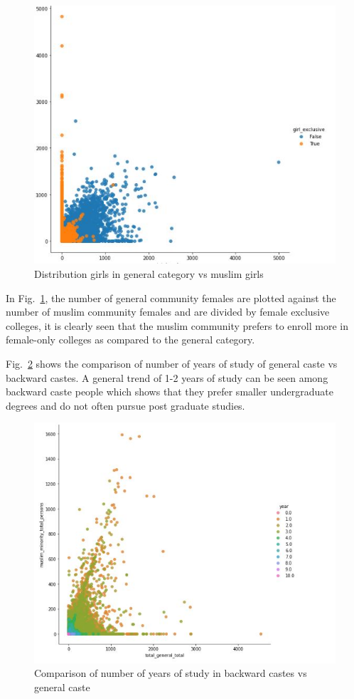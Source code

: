 \begin{figure}[h]
\centerline{\includegraphics[scale=0.6]{figures/girls_general.jpg}}
\caption{Distribution girls in general category vs muslim girls}
\label{girls}
\end{figure}

In Fig.~\ref{girls}, the number of general community females are plotted against the number of muslim community females and are divided by female exclusive colleges, it is clearly seen that the muslim community prefers to enroll more in female-only colleges as compared to the general category.

Fig.~\ref{study_years} shows the comparison of number of years of study of general caste vs backward castes. A general trend of 1-2 years of study can be seen among backward caste people which shows that they prefer smaller undergraduate degrees and do not often pursue post graduate studies.

\begin{figure}[h]
\centerline{\includegraphics[scale=0.6]{figures/years_study.jpg}}
\caption{Comparison of number of years of study in backward castes vs general caste}
\label{study_years}
\end{figure}

